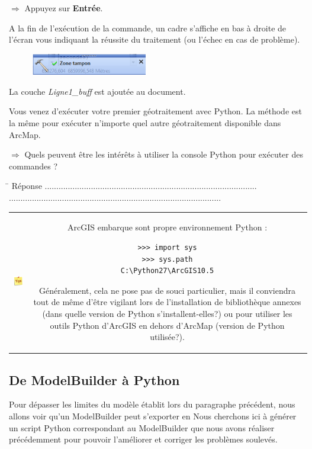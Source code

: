 \documentclass[11pt]{article}
\newcommand{\action}{$\Rightarrow$ }
\newcommand{\reponse}{
	\begin{tabbing}
	\hspace{2cm}\=\kill
	Réponse \> ............................................................................................ \\
 	\> ............................................................................................
	\end{tabbing}
}
\newenvironment{note}{%
	\begin{tabular}[t t]{c c}
		\includegraphics{img/tips.png}
		 &
		\begin{minipage}[c]{0.9\linewidth}
			\begin{sffamily}
}{%
			\end{sffamily}
		\end{minipage}
	\end{tabular}
}
\begin{document}
\action Appuyez sur \textbf{Entrée}.

A la fin de l'exécution de la commande, un cadre s'affiche en bas à droite de l'écran vous indiquant la réussite du traitement (ou l'échec en cas de problème).
\begin{figure}[H]
	\center \includegraphics[width=0.45\textwidth]{img/td3/python_resultat_geotraitement.png}\\
\end{figure}

La couche \textit{Ligne1\_buff} est ajoutée au document.

Vous venez d'exécuter votre premier géotraitement avec Python. La méthode est la même pour exécuter n'importe quel autre géotraitement disponible dans ArcMap.

\action Quels peuvent être les intérêts à utiliser la console Python pour exécuter des commandes ?

\reponse

\begin{note}
ArcGIS embarque sont propre environnement Python :
\begin{lstlisting}
>>> import sys
>>> sys.path
C:\Python27\ArcGIS10.5
\end{lstlisting}
Généralement, cela ne pose pas de souci particulier, mais il conviendra tout de même d'être vigilant lors de l'installation de bibliothèque annexes (dans quelle version de Python s'installent-elles?) ou pour utiliser les outils Python d'ArcGIS en dehors d'ArcMap (version de Python utilisée?).
\end{note}





\subsection{De ModelBuilder à Python}
\label{scriptautonome}
Pour dépasser les limites du modèle établit lors du paragraphe précédent, nous allons voir qu'un ModelBuilder peut s'exporter en
Nous cherchons ici à générer un script Python correspondant au ModelBuilder que nous avons réaliser précédemment pour pouvoir l'améliorer et corriger les problèmes soulevés.
\end{document}
